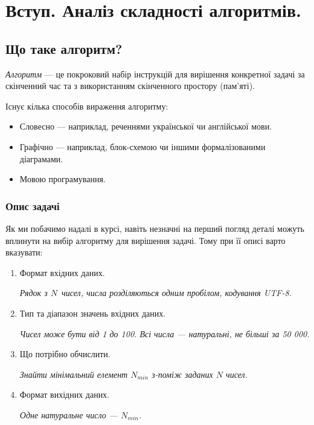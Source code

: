 \documentclass[12pt,a4paper]{report}
\begin{document}
\chapter{Вступ. Аналіз складності алгоритмів.}

\begingroup
\let\clearpage\relax
\tableofcontents
\endgroup



\section{Що таке алгоритм?}
\emph{Алгоритм} --- це покроковий набір інструкцій для вирішення конкретної задачі за скінченний час та з використанням скінченного простору (пам’яті).

\vspace{0.5em}
Існує кілька способів вираження алгоритму:
\begin{itemize}
    \item Словесно --- наприклад, реченнями української чи англійської мови.
    \item Графічно --- наприклад, блок-схемою чи іншими формалізованими діаграмами.
    \item Мовою програмування.
\end{itemize}


\begin{minipage}{\linewidth}
\subsection*{Опис задачі}
Як ми побачимо надалі в курсі, навіть незначні на перший погляд деталі можуть вплинути на вибір алгоритму для вирішення задачі.
Тому при її описі варто вказувати:
\begin{enumerate}
    \item Формат вхідних даних.

        {\itshape Рядок з \(N\)\ чисел, числа розділяються одним пробілом, кодування UTF-8. }

    \item Тип та діапазон значень вхідних даних.

        {\itshape Чисел може бути від 1 до 100. Всі числа --- натуральні, не більші за 50 000.}

    \item Що потрібно обчислити.

        {\itshape Знайти мінімальний елемент \(N_{min}\) з-поміж заданих \(N\) чисел.}

    \item Формат вихідних даних.

        {\itshape Одне натуральне число --- \(N_{min}\).}

\end{enumerate}
\end{minipage}
\end{document}
